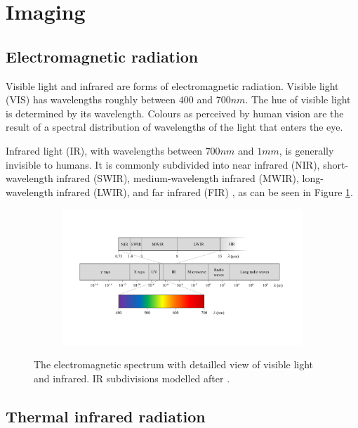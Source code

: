 \documentclass{l4proj}
\begin{document}
\section{Imaging}

\subsection{Electromagnetic radiation}

Visible light and infrared are forms of electromagnetic radiation. Visible light (VIS) has wavelengths roughly between $400$ and $700 nm$. The hue of visible light is determined by its wavelength. Colours as perceived by human vision are the result of a spectral distribution of wavelengths of the light that enters the eye. 

Infrared light (IR), with wavelengths between $700 nm$ and $1 mm$, is generally invisible to humans. It is commonly subdivided into near infrared (NIR), short-wavelength infrared (SWIR), medium-wavelength infrared (MWIR), long-wavelength infrared (LWIR), and far infrared (FIR) \citep[p. 28]{byrnes_unexploded_2008}, as can be seen in Figure \ref{fig:em_spectrum}.

\begin{figure}[ht]
  \centering
  \begin{subfigure}[h!]{0.9\textwidth}
    \includegraphics[width=\textwidth, trim={1.5cm 4cm 2cm 4cm}, clip=true]{images/EM_spectrum.pdf}
  \end{subfigure}
  \caption{The electromagnetic spectrum with detailled view of visible light and infrared. IR subdivisions modelled after \citet[p. 28]{byrnes_unexploded_2008}.}
  \label{fig:em_spectrum}
\end{figure}

\subsection{Thermal infrared radiation}
\end{document}
